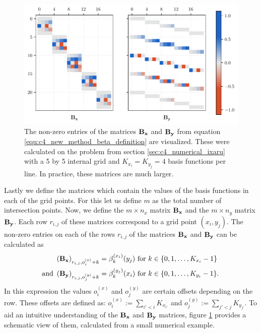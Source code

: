 \begin{figure}
    \begin{center}
        \includegraphics[width=\textwidth]{img/chapter4/new_method_beta.pdf}
        \caption{The non-zero entries of the matrices $\vb{B_x}$ and $\vb{B_y}$ from equation \eqref{equ:c4_new_method_beta_definition} are visualized. These were calculated on the problem from section \ref{sec:c4_numerical_ixaru} with a 5 by 5 internal grid and $K_{x_i} = K_{y_j} = 4$ basis functions per line. In practice, these matrices are much larger.}
        \label{fig:c4_new_method_beta}
    \end{center}
\end{figure}

Lastly we define the matrices which contain the values of the basis functions in each of the grid points. For this let us define $m$ as the total number of intersection points. Now, we define the $m \times n_x$ matrix $\vb{B_x}$ and the $m \times n_y$ matrix $\vb{B_y}$. Each row $r_{i,j}$ of these matrices correspond to a grid point $(x_i, y_j)$. The non-zero entries on each of the rows $r_{i,j}$ of the matrices $\vb{B_x}$ and $\vb{B_y}$ can be calculated as
\begin{align}
    \left(\vb{B_x}\right)_{r_{i,j}, o^{(x)}_{i} + k} & =  \beta_{k}^{(x_i)}(y_j) \text{ for $k \in \{0, 1, \dots, K_{x_i} - 1\}$ }   \nonumber                               \\
    \text{and }
    \left(\vb{B_y}\right)_{r_{i,j}, o^{(y)}_{j} + k} & =  \beta_{k}^{(y_j)}(x_i) \text{ for $k \in \{0, 1, \dots, K_{y_i} - 1\}$.} \label{equ:c4_new_method_beta_definition}
\end{align}
In this expression the values $o^{(x)}_{i}$ and $o^{(y)}_{j}$ are certain offsets depending on the row. These offsets are defined as: $o^{(x)}_{i} := \sum_{i' < i} K_{x_{i'}}$ and $o^{(y)}_{j} := \sum_{j' < j} K_{y_{j'}}$. To aid an intuitive understanding of the $\vb{B_x}$ and $\vb{B_y}$ matrices, figure \ref{fig:c4_new_method_beta} provides a schematic view of them, calculated from a small numerical example.


